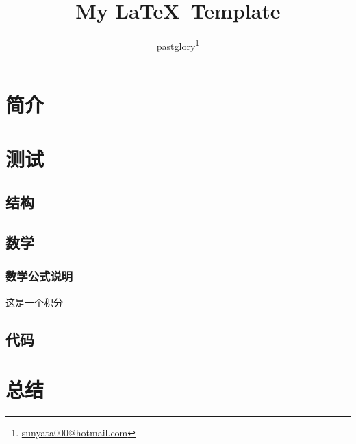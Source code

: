 \documentclass[zh, a4paper, 12pt]{pgreport}
\title {My \LaTeX\ Template}
\author{pastglory\thanks{\href{mailto:sunyata000@hotmail.com}{sunyata000@hotmail.com}}}
\date{}
\begin{document}
\maketitle
\tableofcontents

\newpage

\begin{abstract}

\end{abstract}

\newpage

\section{简介}


\section{测试}

\subsection{结构}


\subsection{数学}


\subsubsection{数学公式说明}
这是一个积分

\subsection{代码}


\section{总结}



\end{document}
